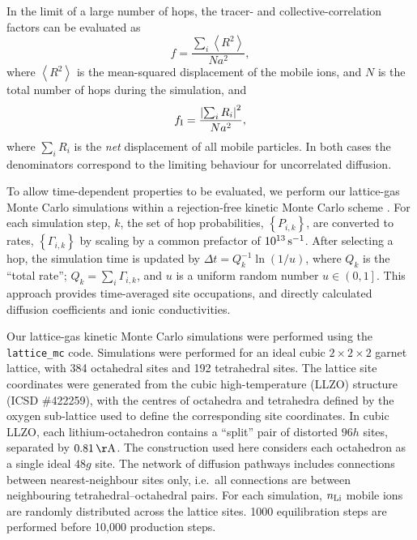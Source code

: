 \documentclass[aps,prb,twocolumn,superscriptaddress,reprint]{revtex4-1}
\newcommand{\set}[1]{\left\{#1\right\}}
\begin{document}
In the limit of a large number of hops, the tracer- and collective-correlation factors can be evaluated as
\begin{equation}
  f = \frac{\sum_i\left<R^2\right>}{Na^2},
  \label{eqn:tracer_correlation_factor}
\end{equation}
where $\left<R^2\right>$ is the mean-squared displacement of the mobile ions, and $N$ is the total number of hops during the simulation, and
\begin{equation}
  f_{\mathrm{I}} = \frac{\left|\sum_i R_i\right|^2}{Na^2},
  \label{eqn:collective_correlation_factor}
\end{equation}
where $\sum_i R_i$ is the \emph{net} displacement of all mobile particles. 
In both cases the denominators correspond to the limiting behaviour for uncorrelated diffusion.

To allow time-dependent properties to be evaluated, we perform our lattice-gas Monte Carlo simulations within a rejection-free kinetic Monte Carlo scheme \cite{Voter_RadiationEffectsInSolids2007}. 
For each simulation step, $k$, the set of hop probabilities, $\set{P_{i,k}}$, are converted to rates, $\set{\Gamma_{i,k}}$ by scaling by a common prefactor of $10^{13}\,\mathrm{s}^{-1}$. 
After selecting a hop, the simulation time is updated by $\Delta t = Q_k^{-1}\ln\left(1/u\right)$, where $Q_k$ is the ``total rate''; $Q_k=\sum_i \Gamma_{i,k}$, and $u$ is a uniform random number $u\in\left(0,1\right]$. 
This approach provides time-averaged site occupations, and directly calculated diffusion coefficients and ionic conductivities.

Our lattice-gas kinetic Monte Carlo simulations were performed using the \texttt{lattice\_mc} code.\cite{Morgan_JOSS2017} 
Simulations were performed for an ideal cubic $2\times2\times2$ garnet lattice, with 384 octahedral sites and 192 tetrahedral sites. 
The lattice site coordinates were generated from the cubic high-temperature  (LLZO) structure (ICSD \#422259),\cite{AwakaEtAl_ChemLett2011} with the centres of octahedra and tetrahedra defined by the oxygen sub-lattice used to define the corresponding site coordinates. 
In cubic LLZO, each lithium-octahedron contains a ``split'' pair of distorted $96h$ sites, separated by $0.81\u{\AA}$. 
The construction used here considers each octahedron as a single ideal $48g$ site. 
The network of diffusion pathways includes connections between nearest-neighbour sites only, i.e.\ all connections are between neighbouring tetrahedral--octahedral pairs.  For each simulation, $n_{\mathrm{Li}}$ mobile ions are randomly distributed across the lattice sites. 1000 equilibration steps are performed before 10,000 production steps. 
\end{document}
